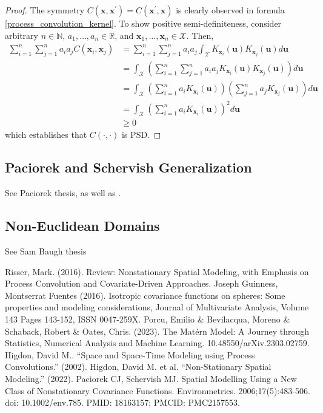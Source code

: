 \documentclass[12pt]{article}
\newcommand{\R}{\mathbb{R}}
\newcommand{\Ker}{K}
\newcommand{\covFun}{C}
\newcommand{\locSpace}{\mathcal{X}}
\newcommand{\loc}{\mathbf{x}}
\newcommand{\locTwo}{\loc^\prime}
\newcommand{\locDum}{\mathbf{u}}
\begin{document}
\begin{proof} 
The symmetry $\covFun(\loc, \locTwo) = \covFun(\locTwo, \loc)$ is clearly observed in formula \ref{process_convolution_kernel}. To show positive semi-definiteness, consider arbitrary 
$n \in \mathbb{N}$, $a_1, \dots, a_n \in \R$, and $\loc_1, \dots, \loc_n \in \locSpace$. Then, 
\begin{align*}
\sum_{i = 1}^{n} \sum_{j = 1}^{n} a_i a_j \covFun(\loc_i, \loc_j) 
&= \sum_{i = 1}^{n} \sum_{j = 1}^{n} a_i a_j \int_{\locSpace} \Ker_{\loc_i}(\locDum) \Ker_{\loc_j}(\locDum) d\locDum \\
&= \int_{\locSpace} \left(\sum_{i = 1}^{n} \sum_{j = 1}^{n} a_i a_j  \Ker_{\loc_i}(\locDum) \Ker_{\loc_j}(\locDum)\right) d\locDum \\
&=  \int_{\locSpace} \left(\sum_{i = 1}^{n} a_i \Ker_{\loc_i}(\locDum)\right)  \left(\sum_{j = 1}^{n} a_j \Ker_{\loc_j}(\locDum)\right) d\locDum \\
&=  \int_{\locSpace} \left(\sum_{i = 1}^{n} a_i \Ker_{\loc_i}(\locDum)\right)^2 d\locDum \\
&\geq 0
\end{align*}
which establishes that $\covFun(\cdot, \cdot)$ is PSD. 
\end{proof} 

\subsection{Paciorek and Schervish Generalization}
See Paciorek thesis, as well as \cite{Paciorek}. 

\subsection{Non-Euclidean Domains}
See Sam Baugh thesis


\begin{thebibliography}{20}
 Risser, Mark. (2016). Review: Nonstationary Spatial Modeling, with Emphasis on Process Convolution and Covariate-Driven Approaches. 
 Joseph Guinness, Montserrat Fuentes (2016). Isotropic covariance functions on spheres: Some properties and modeling considerations, Journal of Multivariate Analysis, Volume 143
Pages 143-152, ISSN 0047-259X.
 Porcu, Emilio \& Bevilacqua, Moreno \& Schaback, Robert \& Oates, Chris. (2023). The Mat\'ern Model: A Journey through Statistics, Numerical Analysis and Machine Learning. 10.48550/arXiv.2303.02759. 
 Higdon, David M.. “Space and Space-Time Modeling using Process Convolutions.” (2002).
 Higdon, David M. et al. “Non-Stationary Spatial Modeling.” (2022).
 Paciorek CJ, Schervish MJ. Spatial Modelling Using a New Class of Nonstationary Covariance Functions. Environmetrics. 2006;17(5):483-506. doi: 10.1002/env.785. PMID: 18163157; PMCID: PMC2157553.
\end{thebibliography}
\end{document}
